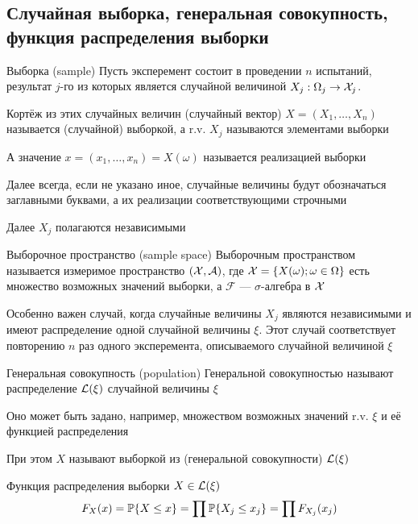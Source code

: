 \subsection{Случайная выборка, генеральная совокупность, функция распределения выборки}

\begin{dfn}{Выборка (sample)}
Пусть эксперемент состоит в проведении $n$ испытаний,
результат $j$-го из которых
является случайной величиной $X_j: \Omega_j\to\mathcal X_j$.

Кортёж из этих случайных величин (случайный вектор)
$X = (X_1, \dotsc, X_n)$ называется (случайной) выборкой,
а r.v. $X_j$ называются элементами выборки

А значение $x = (x_1, \dotsc, x_n) = X(\omega)$ называется реализацией выборки

Далее всегда, если не указано иное,
случайные величины будут обозначаться заглавными буквами,
а их реализации соответствующими строчными

Далее $X_j$ полагаются независимыми
\end{dfn}

\begin{dfn}{Выборочное пространство (sample space)}
Выборочным пространством
называется измеримое пространство
$(\mathcal X, \mathcal A)$,
где $\mathcal X = \{X(\omega) ; \omega\in\Omega\}$
есть множество возможных значений выборки,
а $\mathcal F$ --- $\sigma$-алгебра в $\mathcal X$
\end{dfn}

Особенно важен случай, когда случайные величины $X_j$
являются независимыми и
имеют распределение одной случайной величины $\xi$.
Этот случай соответствует повторению $n$ раз одного эксперемента,
описываемого случайной величиной $\xi$

\begin{dfn}{Генеральная совокупность (population)}
Генеральной совокупностью
называют распределение $\mathcal L(\xi)$ случайной величины $\xi$

Оно может быть задано, например, множеством возможных значений r.v. $\xi$
и её функцией распределения

При этом $X$ называют выборкой из (генеральной совокупности) $\mathcal L(\xi)$
\end{dfn}

\begin{dfn}{Функция распределения выборки}
 $X\in\mathcal L(\xi)$
$$F_X(x) = \mathbb P\{X\leq x\} = \prod\mathbb P\{X_j\leq x_j\} = \prod F_{X_j}(x_j)$$
\end{dfn}
